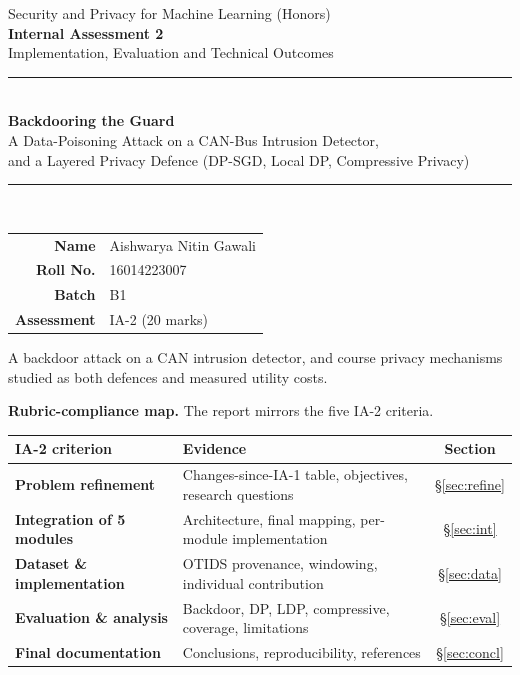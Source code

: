 \documentclass[11pt,a4paper]{article}
\begin{document}
\begin{titlepage}\centering
\vspace*{1.2cm}
{\large Security and Privacy for Machine Learning (Honors)}\\[0.3cm]
{\large\bfseries Internal Assessment 2}\\[0.2cm]
{\normalsize Implementation, Evaluation and Technical Outcomes}\\[1.6cm]
\rule{\textwidth}{0.4pt}\\[0.5cm]
{\LARGE\bfseries Backdooring the Guard}\\[0.4cm]
{\large A Data-Poisoning Attack on a CAN-Bus Intrusion Detector,\\
and a Layered Privacy Defence (DP-SGD, Local DP, Compressive Privacy)}\\[0.5cm]
\rule{\textwidth}{0.4pt}\\[2.2cm]
\begin{tabular}{rl}
\textbf{Name} & Aishwarya Nitin Gawali\\[4pt]
\textbf{Roll No.} & 16014223007\\[4pt]
\textbf{Batch} & B1\\[4pt]
\textbf{Assessment} & IA-2 (20 marks)\\
\end{tabular}
\vfill
{\small A backdoor attack on a CAN intrusion detector, and course privacy
mechanisms studied as both defences and measured utility costs.}
\end{titlepage}

\tableofcontents\vspace{0.5cm}
\begin{shaded}\noindent\textbf{Rubric-compliance map.} The report mirrors the five IA-2 criteria.\end{shaded}
\begin{center}\small
\begin{tabularx}{\textwidth}{>{\bfseries}p{3.4cm}Yc}
\toprule IA-2 criterion & Evidence & Section\\ \midrule
Problem refinement & Changes-since-IA-1 table, objectives, research questions & \S\ref{sec:refine}\\
Integration of 5 modules & Architecture, final mapping, per-module implementation & \S\ref{sec:int}\\
Dataset \& implementation & OTIDS provenance, windowing, individual contribution & \S\ref{sec:data}\\
Evaluation \& analysis & Backdoor, DP, LDP, compressive, coverage, limitations & \S\ref{sec:eval}\\
Final documentation & Conclusions, reproducibility, references & \S\ref{sec:concl}\\
\bottomrule\end{tabularx}\end{center}
\end{document}
